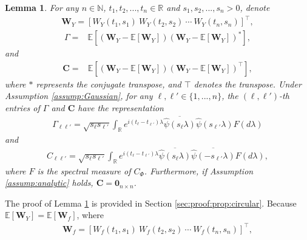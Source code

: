 \documentclass{amsart}
\newtheorem{Lemma}{Lemma}
\begin{document}
\begin{Lemma}\label{prop:circular}
For any $n\in \mathbb{N}$, $t_{1},t_{2},...,t_{n}\in \mathbb{R}$ and $s_{1},s_{2},...,s_{n}>0$,
denote
\begin{align}\label{vector:WY}
\mathbf{W}_{Y} = \left[W_{Y}(t_{1},s_{1})\ W_{Y}(t_{2},s_{2})\ \cdots\ W_{Y}(t_{n},s_{n})\right]^{\top},
\end{align}
\begin{align}\label{def:Gamma}
\Gamma =& \mathbb{E}\left[\left(\mathbf{W}_{Y}-\mathbb{E}\left[\mathbf{W}_{Y}\right]\right)
\left(\mathbf{W}_{Y}-\mathbb{E}\left[\mathbf{W}_{Y}\right]\right)^{*}
\right],
\end{align}
and
\begin{align*}%
\mathbf{C} =& \mathbb{E}[\left(\mathbf{W}_{Y}-\mathbb{E}\left[\mathbf{W}_{Y}\right]\right)
\left(\mathbf{W}_{Y}-\mathbb{E}\left[\mathbf{W}_{Y}\right]\right)^{\top}
],
\end{align*}
where $*$ represents the conjugate transpose, and $\top$ denotes the transpose.
Under Assumption \ref{assump:Gaussian}, for any $\ell,\ell'\in \{1,...,n\}$, the $(\ell,\ell')$-th entries of $\Gamma$
and $\mathbf{C}$ have the representation
\begin{align}\label{entry_Gamma}
\Gamma_{\ell\ell'}= \sqrt{s_{\ell}s_{\ell'}}\int_{\mathbb{R}}e^{i(t_{\ell}-t_{\ell'})\lambda}\overline{\widehat{\psi}(s_{\ell}\lambda)}
\widehat{\psi}(s_{\ell'}\lambda)F(d\lambda)
\end{align}
and
\begin{align}\label{entry_pseudoC}
C_{\ell\ell'}= \sqrt{s_{\ell}s_{\ell'}}\int_{\mathbb{R}}e^{i(t_{\ell}-t_{\ell'})\lambda}\overline{\widehat{\psi}(s_{\ell}\lambda)}
\overline{\widehat{\psi}(-s_{\ell'}\lambda)}F(d\lambda),
\end{align}
where $F$ is the spectral measure of $C_{\Phi}$.
Furthermore, if Assumption \ref{assump:analytic} holds,
$\mathbf{C}=\mathbf{0}_{n\times n}$.
\end{Lemma}
The proof of Lemma \ref{prop:circular} is provided in Section \ref{sec:proof:prop:circular}.
Because $\mathbb{E}[\mathbf{W}_{Y}]=\mathbb{E}[\mathbf{W}_{f}]$, where
\begin{align*}%
\mathbf{W}_{f} = \left[W_{f}(t_{1},s_{1})\ W_{f}(t_{2},s_{2})\ \cdots\ W_{f}(t_{n},s_{n})\right]^{\top},
\end{align*}
\end{document}
